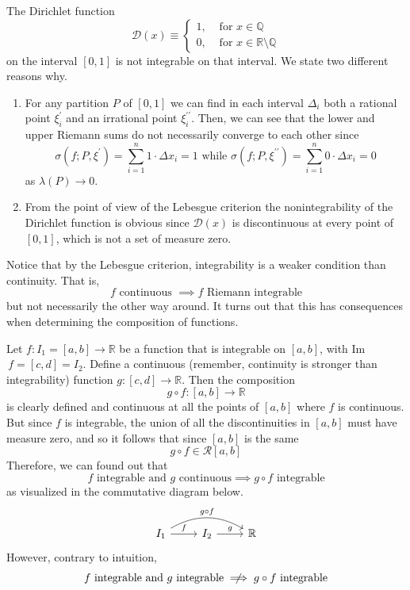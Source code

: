   \begin{example}
  The Dirichlet function
  \[\mathcal{D}(x) \equiv \begin{cases}
  1, & \text{ for } x \in \mathbb{Q} \\
  0, & \text{ for } x \in \mathbb{R} \setminus \mathbb{Q}
  \end{cases}\]
  on the interval $[0,1]$ is not integrable on that interval. We state two different reasons why. 
  \begin{enumerate}
    \item For any partition $P$ of $[0,1]$ we can find in each interval $\Delta_i$ both a rational point $\xi^\prime_i$ and an irrational point $\xi_i^{\prime\prime}$. Then, we can see that the lower and upper Riemann sums do not necessarily converge to each other since
    \[\sigma(f; P, \xi^\prime) = \sum_{i=1}^n 1 \cdot \Delta x_i = 1 \text{ while } \sigma(f;P, \xi^{\prime\prime}) = \sum_{i=1}^n 0 \cdot \Delta x_i = 0\]
    as $\lambda(P) \rightarrow 0$. 
    \item From the point of view of the Lebesgue criterion the nonintegrability of the Dirichlet function is obvious since $\mathcal{D}(x)$ is discontinuous at every point of $[0, 1]$, which is not a set of measure zero. 
  \end{enumerate}
  \end{example}

  Notice that by the Lebesgue criterion, integrability is a weaker condition than continuity. That is, 
  \[f \text{ continuous } \implies f \text{ Riemann integrable}\]
  but not necessarily the other way around. It turns out that this has consequences when determining the composition of functions. 

  \begin{proposition}
  Let $f: I_1 = [a, b] \longrightarrow\mathbb{R}$ be a function that is integrable on $[a, b]$, with Im$\,f = [c, d] = I_2$. Define a continuous (remember, continuity is stronger than integrability) function $g: [c, d] \longrightarrow \mathbb{R}$. Then the composition
  \[g \circ f: [a, b] \longrightarrow \mathbb{R}\]
  is clearly defined and continuous at all the points of $[a, b]$ where $f$ is continuous. But since $f$ is integrable, the union of all the discontinuities in $[a, b]$ must have measure zero, and so it follows that since $[a, b]$ is the same  
  \[g \circ f \in \mathcal{R}[a, b]\]
  Therefore, we can found out that 
  \[f \text{ integrable and } g \text{ continuous} \implies g \circ f \text{ integrable}\]
  as visualized in the commutative diagram below. 
  \[
    \begin{tikzcd}
      I_1 \arrow[r, "f"] \arrow[rr, bend left, "g \circ f"] & I_2 \arrow[r, "g"] & \mathbb{R}
    \end{tikzcd}
  \]
  However, contrary to intuition, 
  \[f \text{ integrable and } g \text{ integrable} \centernot\implies g \circ f \text{ integrable}\]
  \end{proposition}

